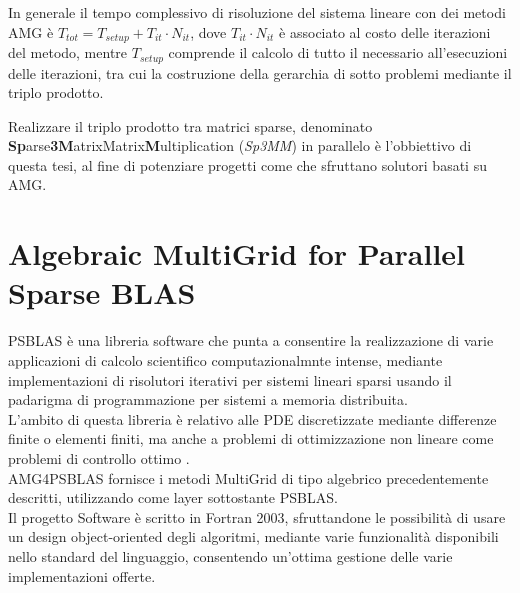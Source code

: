 In generale il tempo complessivo di risoluzione del sistema lineare con dei metodi AMG è  $T_{tot} = T_{setup} + T_{it}\cdot N_{it}$,
dove $T_{it}\cdot N_{it}$ è associato al costo delle iterazioni del metodo, 
mentre $T_{setup}$ comprende il calcolo di tutto il necessario all'esecuzioni delle iterazioni,
tra cui la costruzione della gerarchia di sotto problemi mediante il triplo prodotto.\\ %
\par\null\par
Realizzare il triplo prodotto tra matrici sparse, denominato \\{\bf{Sp}}arse{\bf{3}}{\bf{M}}atrixMatrix{\bf{M}}ultiplication (\emph{Sp3MM})
in parallelo è l'obbiettivo di questa tesi, al fine di potenziare progetti come \cite{AMG4PSBLAS} che sfruttano solutori basati su AMG.\\
\section{Algebraic MultiGrid for Parallel Sparse BLAS} \label{amg4psblas}
PSBLAS è una libreria software che punta a consentire la realizzazione di varie applicazioni di calcolo scientifico computazionalmnte intense,
mediante implementazioni di risolutori iterativi per sistemi lineari sparsi 
usando il padarigma di programmazione per sistemi a memoria distribuita.\\
L'ambito di questa libreria è relativo alle PDE discretizzate mediante differenze finite o elementi finiti,
ma anche a problemi di ottimizzazione non lineare come problemi di controllo ottimo \cite{PSBLAS3man}.\\
AMG4PSBLAS \cite{AMG4PSBLASman} fornisce i metodi MultiGrid di tipo algebrico precedentemente descritti,
utilizzando come layer sottostante PSBLAS.\\
Il progetto Software è scritto in Fortran 2003, sfruttandone le possibilità di 
usare un design object-oriented degli algoritmi, mediante varie funzionalità disponibili nello standard del linguaggio,
consentendo un'ottima gestione delle varie implementazioni offerte. 
